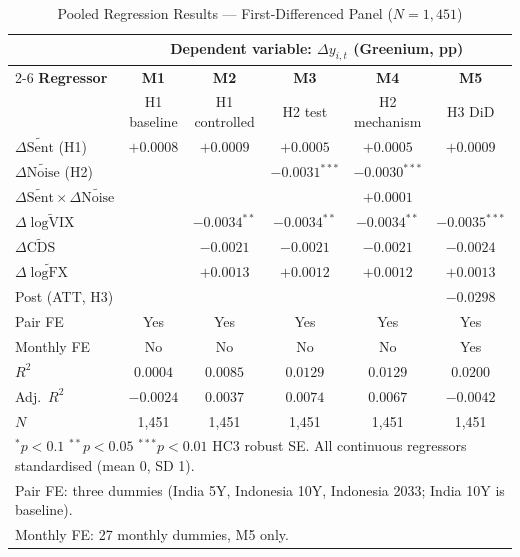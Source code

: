 \documentclass[12pt,a4paper]{article}
\begin{document}
\begin{table}[H]
\centering
\caption{Pooled Regression Results --- First-Differenced Panel ($N = 1{,}451$)}
\label{tab:regression}
\small
\setlength{\tabcolsep}{6pt}
\begin{tabular}{lccccc}
\toprule
 & \multicolumn{5}{c}{\textbf{Dependent variable: $\Delta y_{i,t}$ (Greenium, pp)}} \\
\cmidrule(lr){2-6}
\textbf{Regressor} & \textbf{M1} & \textbf{M2} & \textbf{M3} & \textbf{M4} & \textbf{M5} \\
 & H1 baseline & H1 controlled & H2 test & H2 mechanism & H3 DiD \\
\midrule
$\Delta\widetilde{\text{Sent}}$ (H1)
  & $+0.0008$ & $+0.0009$ & $+0.0005$ & $+0.0005$ & $+0.0009$ \\
$\Delta\widetilde{\text{Noise}}$ (H2)
  & & & $-0.0031^{***}$ & $-0.0030^{***}$ & \\
$\Delta\widetilde{\text{Sent}} \times \Delta\widetilde{\text{Noise}}$
  & & & & $+0.0001$ & \\
$\Delta\widetilde{\log\text{VIX}}$
  & & $-0.0034^{**}$ & $-0.0034^{**}$ & $-0.0034^{**}$ & $-0.0035^{***}$ \\
$\Delta\widetilde{\text{CDS}}$
  & & $-0.0021$ & $-0.0021$ & $-0.0021$ & $-0.0024$ \\
$\Delta\widetilde{\log\text{FX}}$
  & & $+0.0013$ & $+0.0012$ & $+0.0012$ & $+0.0013$ \\
Post (ATT, H3)
  & & & & & $-0.0298$ \\
\midrule
Pair FE       & Yes & Yes & Yes & Yes & Yes \\
Monthly FE    & No  & No  & No  & No  & Yes \\
\midrule
$R^2$         & $0.0004$ & $0.0085$ & $0.0129$ & $0.0129$ & $0.0200$ \\
Adj.\ $R^2$   & $-0.0024$ & $0.0037$ & $0.0074$ & $0.0067$ & $-0.0042$ \\
$N$           & 1,451 & 1,451 & 1,451 & 1,451 & 1,451 \\
\midrule
\multicolumn{6}{l}{\footnotesize $^{*}p<0.1$ \quad $^{**}p<0.05$ \quad $^{***}p<0.01$ \quad HC3 robust SE. All continuous regressors standardised (mean 0, SD 1).} \\
\multicolumn{6}{l}{\footnotesize Pair FE: three dummies (India 5Y, Indonesia 10Y, Indonesia 2033; India 10Y is baseline).} \\
\multicolumn{6}{l}{\footnotesize Monthly FE: 27 monthly dummies, M5 only.} \\
\bottomrule
\end{tabular}
\end{table}
\end{document}
